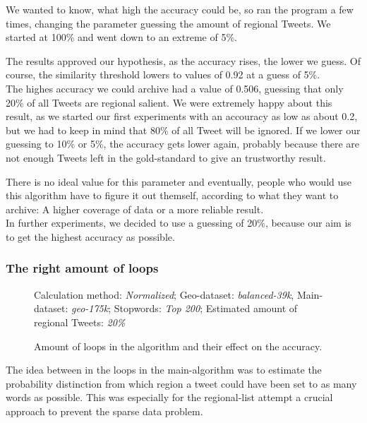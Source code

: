 \documentclass[../Main.tex]{subfiles}
\begin{document}
We wanted to know, what high the accuracy could be, so ran the program a few times, changing the parameter guessing the amount of regional Tweets. We started at 100\% and went down to an extreme of 5\%.

The results approved our hypothesis, as the accuracy rises, the lower we guess. Of course, the similarity threshold lowers to values of 0.92 at a guess of 5\%. \\
The highes accuracy we could archive had a value of 0.506, guessing that only 20\% of all Tweets are regional salient. We were extremely happy about this result, as we started our first experiments with an accouracy as low as about 0.2, but we had to keep in mind that 80\% of all Tweet will be ignored. If we lower our guessing to 10\% or 5\%, the accuracy gets lower again, probably because there are not enough Tweets left in the gold-standard to give an trustworthy result. 

There is no ideal value for this parameter and eventually, people who would use this algorithm have to figure it out themself, according to what they want to archive: A higher coverage of data or a more reliable result. \\
In further experiments, we decided to use a guessing of 20\%, because our aim is to get the highest accuracy as possible.

\subsubsection{The right amount of loops}
\begin{figure}

Calculation method: \textit{Normalized}; Geo-dataset: \textit{balanced-39k}, Main-dataset: \textit{geo-175k}; Stopwords: \textit{Top 200}; Estimated amount of regional Tweets: \textit{20\%}
  \caption{Amount of loops in the algorithm and their effect on the accuracy.}
  \label{geo_graph3}
\end{figure}
The idea between in the loops in the main-algorithm was to estimate the probability distinction from which region a tweet could have been set to as many words as possible. This was especially for the regional-list attempt a crucial approach to prevent the sparse data problem.
\end{document}
